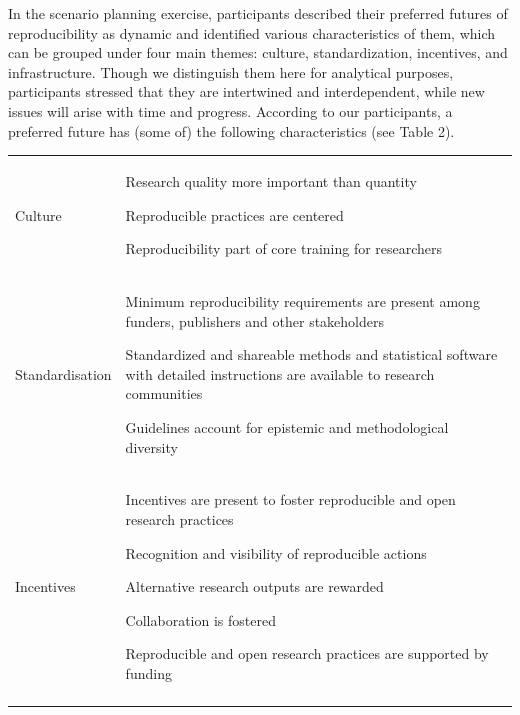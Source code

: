 \documentclass[authordate, meta]{jote-new-article}
\begin{document}
	In the scenario planning exercise, participants described their preferred futures of reproducibility as dynamic and identified various characteristics of them, which can be grouped under four main themes: culture, standardization, incentives, and infrastructure. Though we distinguish them here for analytical purposes, participants stressed that they are intertwined and interdependent, while new issues will arise with time and progress. According to our participants, a preferred future has (some of) the following characteristics (see Table 2).

\begin{table}
\begin{tabularx}{\linewidth}{@{} l X @{}}
    \toprule
    Culture & \begin{tabitemize}
        \item Research quality more important than quantity
        \item Reproducible practices are centered
        \item Reproducibility part of core training for researchers
    \end{tabitemize} \\ \addlinespace
    
    \midrule
    Standardisation & \begin{tabitemize}
        \item Minimum reproducibility requirements are present among funders, publishers and other stakeholders
        \item Standardized and shareable methods and statistical software with detailed instructions are available to research communities
        \item Guidelines account for epistemic and methodological diversity
    \end{tabitemize} \\  \addlinespace
    
    \midrule
    Incentives & \begin{tabitemize}
        \item Incentives are present to foster reproducible and open research practices
        \item Recognition and visibility of reproducible actions
        \item Alternative research outputs are rewarded
        \item Collaboration is fostered
        \item Reproducible and open research practices are supported by funding
    \end{tabitemize} \\ \addlinespace
    

\end{tabularx}
\end{table}
\end{document}
